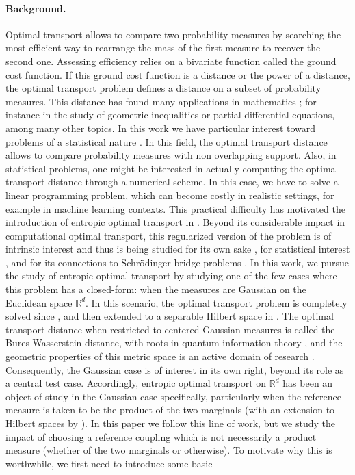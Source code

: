 \documentclass[]{article}
\numberwithin{equation}{section}
\theoremstyle{plain}
\begin{document}
\paragraph{Background.} 
Optimal transport allows to compare two probability measures by searching the most efficient way to rearrange the mass of the first measure to recover the second one. Assessing efficiency relies on a bivariate function called the ground cost function. If this ground cost function is a distance or the power of a distance, the optimal transport problem defines a distance on a subset of probability measures. This distance has found many applications in mathematics \cite{villani2009optimal, ambrosioGradientflowsmetric2005a}; for instance in the study of geometric inequalities or partial differential equations, among many other topics. In this work we have particular interest toward problems of a statistical nature \cite{panaretos2020invitation, chewi2024statistical}. In this field, the optimal transport distance allows to compare probability measures with non overlapping support. Also, in statistical problems, one might be interested in actually computing the optimal transport distance through a numerical scheme. In this case, we have to solve a linear programming problem, which can become costly in realistic settings, for example in machine learning contexts. This practical difficulty has motivated the introduction of entropic optimal transport in \cite{cuturi2013sinkhorn}. Beyond its considerable impact in computational optimal transport, this regularized version of the problem is of intrinsic interest and thus is being studied for its own sake \cite{nutz2021introduction}, for statistical interest \cite{chizat2020faster, rigollet2025sample}, and for its connections to Schr\"{o}dinger bridge problems \cite{leonardsurveySchrodinger2013}. In this work, we pursue the study of entropic optimal transport by studying one of the few cases where this problem has a closed-form: when the measures are Gaussian on the Euclidean space $\mathbb{R}^d$. In this scenario, the optimal transport problem is completely solved since \cite{givens1984class}, and then extended to a separable Hilbert space in \cite{cuesta1996lower}. The optimal transport distance when restricted to centered Gaussian measures is called the Bures-Wasserstein distance, with roots in quantum information theory \cite{nielsen2001quantum, bengtsson2017geometry}, and the geometric properties of this metric space is an active domain of research \cite{takatsu2011wasserstein, bhatia2019bures}. Consequently, the Gaussian case is of interest in its own right, beyond its role as a central test case. Accordingly, entropic optimal transport on $\mathbb{R}^d$ has been an object of study in the Gaussian case specifically, particularly when the reference measure is taken to be the product of the two marginals \cite{janati2020entropic, mallastoEntropyregularized2WassersteinDistance2022, del2020statistical} (with an extension to Hilbert spaces by \cite{minh2023,yun2025spectral}). In this paper we follow this line of work, but we study the impact of choosing a reference coupling which is not necessarily a product measure (whether of the two marginals or otherwise). To motivate why this is worthwhile, we first need to introduce some basic 
\end{document}
